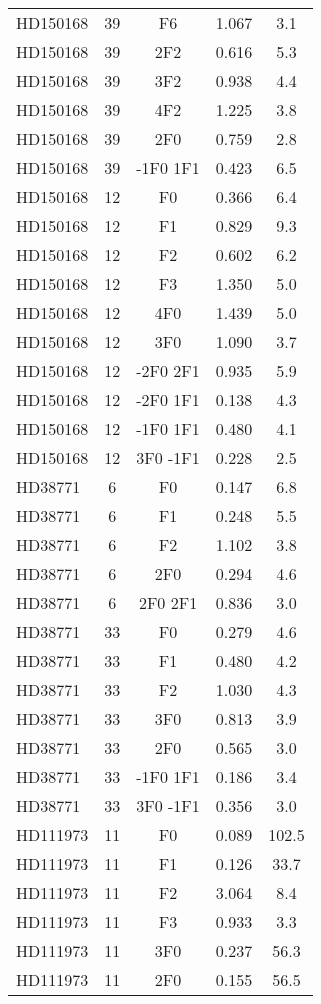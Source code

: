 \begin{table*}
\begin{tabular}{l c c c c}
HD150168 & 39 & F6 & 1.067 & 3.1\\ 
HD150168 & 39 & 2F2 & 0.616 & 5.3\\ 
HD150168 & 39 & 3F2 & 0.938 & 4.4\\ 
HD150168 & 39 & 4F2 & 1.225 & 3.8\\ 
HD150168 & 39 & 2F0 & 0.759 & 2.8\\ 
HD150168 & 39 & -1F0 1F1 & 0.423 & 6.5\\ 
\hline
HD150168 & 12 & F0 & 0.366 & 6.4\\ 
HD150168 & 12 & F1 & 0.829 & 9.3\\ 
HD150168 & 12 & F2 & 0.602 & 6.2\\ 
HD150168 & 12 & F3 & 1.350 & 5.0\\ 
HD150168 & 12 & 4F0 & 1.439 & 5.0\\ 
HD150168 & 12 & 3F0 & 1.090 & 3.7\\ 
HD150168 & 12 & -2F0 2F1 & 0.935 & 5.9\\ 
HD150168 & 12 & -2F0 1F1 & 0.138 & 4.3\\ 
HD150168 & 12 & -1F0 1F1 & 0.480 & 4.1\\ 
HD150168 & 12 & 3F0 -1F1 & 0.228 & 2.5\\ 
\hline
HD38771 & 6 & F0 & 0.147 & 6.8\\ 
HD38771 & 6 & F1 & 0.248 & 5.5\\ 
HD38771 & 6 & F2 & 1.102 & 3.8\\ 
HD38771 & 6 & 2F0 & 0.294 & 4.6\\ 
HD38771 & 6 & 2F0 2F1 & 0.836 & 3.0\\ 
\hline
HD38771 & 33 & F0 & 0.279 & 4.6\\ 
HD38771 & 33 & F1 & 0.480 & 4.2\\ 
HD38771 & 33 & F2 & 1.030 & 4.3\\ 
HD38771 & 33 & 3F0 & 0.813 & 3.9\\ 
HD38771 & 33 & 2F0 & 0.565 & 3.0\\ 
HD38771 & 33 & -1F0 1F1 & 0.186 & 3.4\\ 
HD38771 & 33 & 3F0 -1F1 & 0.356 & 3.0\\ 
\hline
HD111973 & 11 & F0 & 0.089 & 102.5\\ 
HD111973 & 11 & F1 & 0.126 & 33.7\\ 
HD111973 & 11 & F2 & 3.064 & 8.4\\ 
HD111973 & 11 & F3 & 0.933 & 3.3\\ 
HD111973 & 11 & 3F0 & 0.237 & 56.3\\ 
HD111973 & 11 & 2F0 & 0.155 & 56.5\\ 

\end{tabular}
\end{table*}
